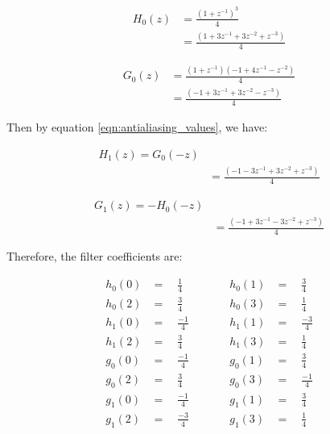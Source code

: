 \begin{equation} \label{eq1}
\begin{split}
H_0(z) & = \frac{(1 + z^{-1})^3}{4} \\
& = \frac{(1 + 3z^{-1} + 3z^{-2} + z^{-3})}{4}
\end{split}
\end{equation}




\begin{equation} \label{eq1}
\begin{split}
G_0(z) & = \frac{(1 + z^{-1})(-1 + 4z^{-1} - z^{-2})}{4} \\
& = \frac{(-1 + 3z^{-1} + 3z^{-2} - z^{-3})}{4}
\end{split}
\end{equation}


Then by equation \ref{eqn:antialiasing_values}, we have:


\begin{equation} \label{eq1}
\begin{split}
H_1(z) = G_0(-z) \\
& = \frac{(-1 - 3z^{-1} + 3z^{-2} + z^{-3})}{4}
\end{split}
\end{equation}


\begin{equation} \label{eq1}
\begin{split}
G_1(z) = -H_0(-z) \\
& = \frac{(-1 + 3z^{-1} - 3z^{-2} + z^{-3})}{4}
\end{split}
\end{equation}

Therefore, the filter coefficients are:

\begin{equation}
\label{eqn:filters}
\begin{aligned}
h_0(0) & =  \quad \frac{1}{4}    & \quad &\quad  h_0(1) &= \quad \frac{3}{4} \\
h_0(2) & =  \quad \frac{3}{4}    & \quad &\quad   h_0(3) &= \quad \frac{1}{4} \\[1ex]
h_1(0) & =  \quad \frac{- 1}{4}  & \quad &\quad   h_1(1) &= \quad \frac{-3}{4} \\
h_1(2) & =  \quad \frac{3}{4}    & \quad &\quad   h_1(3) &= \quad \frac{1}{4} \\[1ex]
g_0(0) & =  \quad \frac{-1}{4}   & \quad &\quad   g_0(1) &= \quad \frac{3}{4} \\
g_0(2) & =  \quad \frac{3}{4}    & \quad &\quad   g_0(3) &= \quad \frac{-1}{4} \\[1ex]
g_1(0) & =  \quad \frac{-1}{4}   & \quad &\quad   g_1(1) &= \quad \frac{3}{4} \\
g_1(2) & =  \quad \frac{-3}{4}   & \quad &\quad   g_1(3) &= \quad \frac{1}{4}
\end{aligned}
\end{equation}

